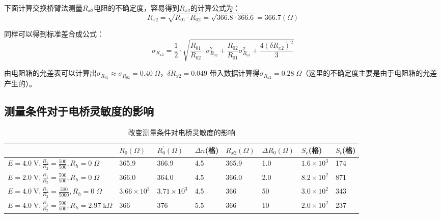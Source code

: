 \documentclass[a4paper]{ctexart}
\begin{document}
    \par 
    下面计算交换桥臂法测量$R_{x2}$电阻的不确定度，容易得到$R_{x2}$的计算公式为：
    $$
    R_{x2} = \sqrt{R_{01}\cdot R_{02}} = \sqrt{366.8 \cdot 366.6} = 366.7(\Omega)
    $$
    \par 
    同样可以得到标准差合成公式：
    $$
    \sigma_{R_{x2}}=\frac{1}{2} \cdot \sqrt{\frac{R_{01}}{R_{02}} \cdot \sigma_{R_{02}}^{2}+\frac{R_{02}}{R_{01}} \sigma_{R_{01}}^{2} + \frac{4(\delta R_{x2})^{2}}{3}}
    $$
    \par 
    由电阻箱的允差表可以计算出$\sigma_{R_{01}} \approx \sigma_{R_{02}} = 0.40\;\Omega$，$\delta R_{x2} = 0.049$
    带入数据计算得$\sigma_{R_{x2}} = 0.28\;\Omega$（这里的不确定度主要是由于电阻箱的允差产生的）。\\
    \subsection{测量条件对于电桥灵敏度的影响}
    \begin{table}[htbp]
        \centering
        \caption{改变测量条件对电桥灵敏度的影响}
        \begin{tabular}{p{130pt}|p{50pt}p{50pt}p{25pt}p{25pt}p{25pt}p{50pt}p{50pt}}
            \toprule[1.5pt]
                    & $R_{0}(\Omega)$ & $R_{0}^{'}(\Omega)$ & $\Delta n$(格) & $R_{x2}(\Omega)$ & $\Delta R_{0}(\Omega)$ & $S_e$(格) & $S_t$(格) \\
            \midrule
            $E=4.0\;\mathrm{V},\frac{R_{1}}{R_{2}} = \frac{500}{500},R_{h} = 0\;\Omega$ & 365.9 & 366.9 & 4.5 & 365.9 & 1.0 & $1.6 \times 10^{3}$ & 174 \\
            $E=2.0\;\mathrm{V},\frac{R_{1}}{R_{2}} = \frac{500}{500},R_{h} = 0\;\Omega$ & 366.0 & 364.0 & 4.5 & 366.0 & 2.0 & $8.2 \times 10^{2}$ & 871 \\
            $E=4.0\;\mathrm{V},\frac{R_{1}}{R_{2}} = \frac{500}{5000},R_{h} = 0\;\Omega$& $3.66\times 10^{3}$ & $3.71\times 10^{3}$ & 4.5 & 366 & 50 & $3.0\times 10^{2}$ & 343 \\
            $E=4.0\;\mathrm{V},\frac{R_{1}}{R_{2}} = \frac{500}{500},R_{h} = 2.97\;\mathrm{k}\Omega$&366 & 376 & 5.5 & 366 & 10 & $2.0 \times 10^{2}$ & 237 \\
            \bottomrule[1.5pt]
        \end{tabular}
    \end{table}
    \par 
    \;
    \par 
    \;
\end{document}
